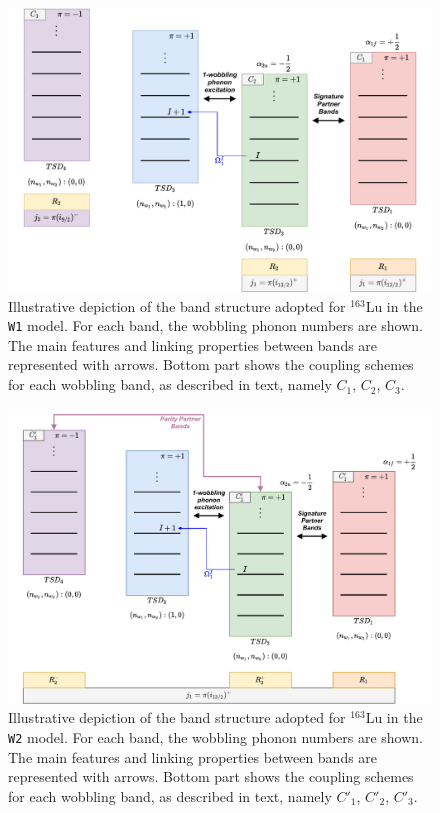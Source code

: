 \documentclass[11pt]{article}
\begin{document}
\begin{figure}
    \centering
    \includegraphics[scale=0.7]{figs/W1_model_approach.pdf}
    \caption{Illustrative depiction of the band structure adopted for $^{163}$Lu in the \texttt{W1} model. For each band, the wobbling phonon numbers are shown. The main features and linking properties between bands are represented with arrows. Bottom part shows the coupling schemes for each wobbling band, as described in text, namely $C_1$, $C_2$, $C_3$.}
    \label{w1-model-worfklow}
\end{figure}
\begin{figure}
   \centering
    \includegraphics[scale=0.7]{figs/W2_model_approach.pdf}
    \caption{Illustrative depiction of the band structure adopted for $^{163}$Lu in the \texttt{W2} model. For each band, the wobbling phonon numbers are shown. The main features and linking properties between bands are represented with arrows. Bottom part shows the coupling schemes for each wobbling band, as described in text, namely $C'_1$, $C'_2$, $C'_3$.}
    \label{w2-model-worfklow}
\end{figure}
\newpage
\end{document}

